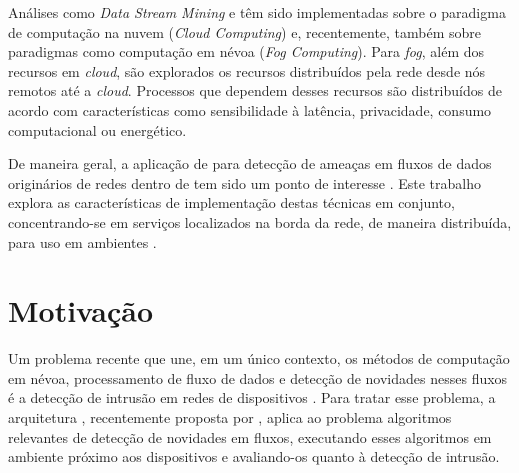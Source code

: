 Análises como \emph{Data Stream Mining} e \nd têm sido implementadas sobre
o paradigma de computação na nuvem (\emph{Cloud Computing}) e, recentemente,
também sobre paradigmas como computação em névoa (\emph{Fog Computing}).
Para \emph{fog}, além dos recursos em \emph{cloud}, são explorados os recursos
distribuídos pela rede desde nós remotos até a \emph{cloud}.
Processos que dependem desses recursos são distribuídos de acordo com
características como sensibilidade à latência, privacidade, consumo
computacional ou energético.

De maneira geral, a aplicação de \nd para detecção de ameaças em fluxos de dados
originários de redes \iot dentro de \nids tem sido um ponto de interesse
\cite{Viegas2019,AndreoniLopez2019,DaCosta2019a}.
Este trabalho explora as características de implementação destas técnicas
em conjunto, concentrando-se em serviços localizados na borda da rede, de maneira
distribuída, para uso em ambientes \iot.



\section{Motivação}\label{sec:motivo}


Um problema recente que une, em um único contexto, os métodos de computação em
névoa, processamento de fluxo de dados e detecção de novidades nesses fluxos é a
detecção de intrusão em redes de dispositivos \iot.
Para tratar esse problema, a arquitetura \arch, recentemente proposta por
, aplica ao problema algoritmos relevantes
de detecção de
novidades em fluxos, executando esses algoritmos em ambiente próximo aos
dispositivos e avaliando-os quanto à detecção de intrusão.

